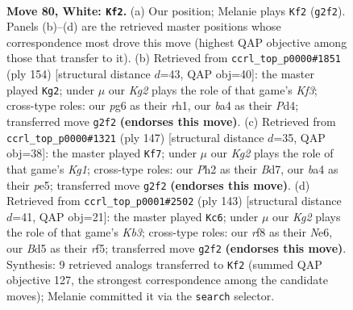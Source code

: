 \documentclass[11pt]{article}
\begin{document}
\clearpage

\begin{figure}[p]\centering
\begin{subfigure}{0.46\textwidth}\centering
\resizebox{\linewidth}{!}{%
\newchessgame
\chessboard[
  setfen={5r2/5p2/n5p1/3BP2p/b4Pp1/3k2N1/6KP/8 w - - 18 80},
  showmover=false,
  pgfstyle=straightmove, color=movearrow, markmove={g2-f2}
]}
\caption{}
\end{subfigure}\hfill
\begin{subfigure}{0.46\textwidth}\centering
\resizebox{\linewidth}{!}{%
\newchessgame
\chessboard[
  setfen={8/4kp2/4p3/3pN1P1/3P2B1/4PK2/8/7r w - - 13 78},
  showmover=false,
  pgfstyle=straightmove, color=movearrow, markmove={f3-g2}
]}
\caption{}
\end{subfigure}
\\[4pt]
\begin{subfigure}{0.46\textwidth}\centering
\resizebox{\linewidth}{!}{%
\newchessgame
\chessboard[
  setfen={6k1/3bB2p/4n2P/4P1p1/2pP4/2P5/6B1/K7 b - - 0 74},
  showmover=false,
  pgfstyle=straightmove, color=movearrow, markmove={g8-f7}
]}
\caption{}
\end{subfigure}\hfill
\begin{subfigure}{0.46\textwidth}\centering
\resizebox{\linewidth}{!}{%
\newchessgame
\chessboard[
  setfen={2b5/8/1k2n3/5Rp1/1Pp5/2Pn1P2/6PK/B7 b - - 14 72},
  showmover=false,
  pgfstyle=straightmove, color=movearrow, markmove={b6-c6}
]}
\caption{}
\end{subfigure}
\caption{\textbf{Move 80, White: \texttt{Kf2}.} (a) Our position; Melanie plays \texttt{Kf2} (\texttt{g2f2}). Panels (b)--(d) are the retrieved master positions whose correspondence most drove this move (highest QAP objective among those that transfer to it). (b) Retrieved from \texttt{ccrl\_top\_p0000\#1851} (ply 154) [structural distance $d$=43, QAP obj=40]: the master played \texttt{Kg2}; under $\mu$ our \emph{Kg2} plays the role of that game's \emph{Kf3}; cross-type roles: our \emph{p}g6 as their \emph{r}h1, our \emph{b}a4 as their \emph{P}d4; transferred move \texttt{g2f2} \textbf{(endorses this move)}. (c) Retrieved from \texttt{ccrl\_top\_p0000\#1321} (ply 147) [structural distance $d$=35, QAP obj=38]: the master played \texttt{Kf7}; under $\mu$ our \emph{Kg2} plays the role of that game's \emph{Kg1}; cross-type roles: our \emph{P}h2 as their \emph{B}d7, our \emph{b}a4 as their \emph{p}e5; transferred move \texttt{g2f2} \textbf{(endorses this move)}. (d) Retrieved from \texttt{ccrl\_top\_p0001\#2502} (ply 143) [structural distance $d$=41, QAP obj=21]: the master played \texttt{Kc6}; under $\mu$ our \emph{Kg2} plays the role of that game's \emph{Kb3}; cross-type roles: our \emph{r}f8 as their \emph{N}e6, our \emph{B}d5 as their \emph{r}f5; transferred move \texttt{g2f2} \textbf{(endorses this move)}. Synthesis: 9 retrieved analogs transferred to \texttt{Kf2} (summed QAP objective 127, the strongest correspondence among the candidate moves); Melanie committed it via the \texttt{search} selector.}
\label{fig:thought-m158}
\end{figure}
\end{document}
